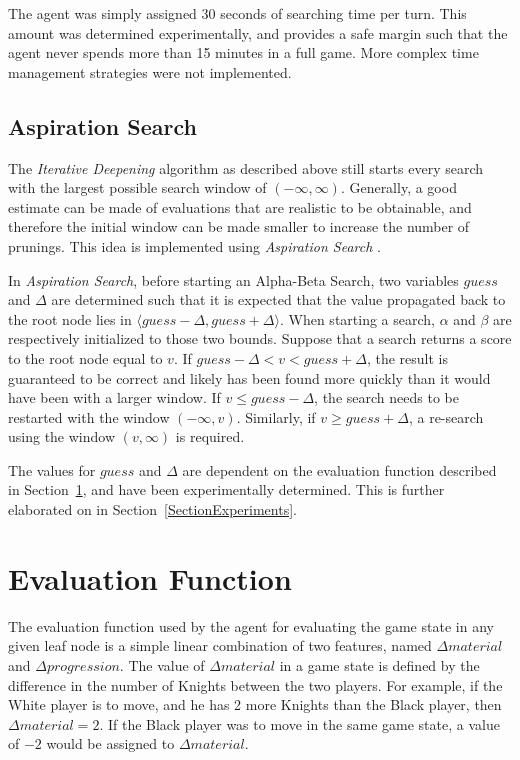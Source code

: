 \documentclass{article}
\newcommand{\refsection}[1]{Section~\ref{#1}}
\begin{document}
The agent was simply assigned 30 seconds of searching time per turn. This amount was determined experimentally, and provides a safe margin such that the agent never spends more than 15 minutes in a full game. More complex time management strategies were not implemented.

\subsection{Aspiration Search}
The \emph{Iterative Deepening} algorithm as described above still starts every search with the largest possible search window of $(-\infty, \infty)$. Generally, a good estimate can be made of evaluations that are realistic to be obtainable, and therefore the initial window can be made smaller to increase the number of prunings. This idea is implemented using \emph{Aspiration Search} \cite{LectureSlidesWindows}.

In \emph{Aspiration Search}, before starting an Alpha-Beta Search, two variables $guess$ and $\Delta$ are determined such that it is expected that the value propagated back to the root node lies in $\langle guess - \Delta, guess + \Delta \rangle$. When starting a search, $\alpha$ and $\beta$ are respectively initialized to those two bounds. Suppose that a search returns a score to the root node equal to $v$. If $guess - \Delta < v < guess + \Delta$, the result is guaranteed to be correct and likely has been found more quickly than it would have been with a larger window. If $v \leq guess - \Delta$, the search needs to be restarted with the window $(-\infty, v)$. Similarly, if $v \geq guess + \Delta$, a re-search using the window $(v, \infty)$ is required.

The values for $guess$ and $\Delta$ are dependent on the evaluation function described in \refsection{SectionEvalFunction}, and have been experimentally determined. This is further elaborated on in \refsection{SectionExperiments}.

\section{Evaluation Function} \label{SectionEvalFunction}
The evaluation function used by the agent for evaluating the game state in any given leaf node is a simple linear combination of two features, named $\Delta material$ and $\Delta progression$. The value of $\Delta material$ in a game state is defined by the difference in the number of Knights between the two players. For example, if the White player is to move, and he has 2 more Knights than the Black player, then $\Delta material = 2$. If the Black player was to move in the same game state, a value of $-2$ would be assigned to $\Delta material$. 
\end{document}
